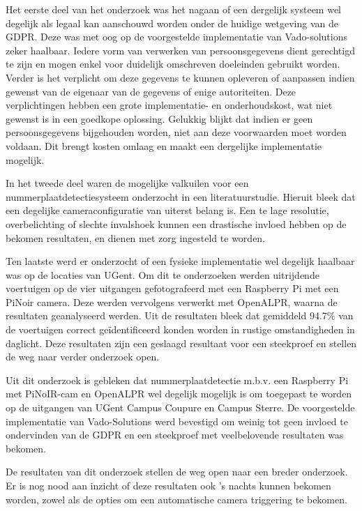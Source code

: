 Het eerste deel van het onderzoek was het nagaan of een dergelijk systeem wel degelijk als legaal kan aanschouwd worden onder de huidige wetgeving van de GDPR. Deze was met oog op de voorgestelde implementatie van Vado-solutions zeker haalbaar. Iedere vorm van verwerken van persoonsgegevens dient gerechtigd te zijn en mogen enkel voor duidelijk omschreven doeleinden gebruikt worden. Verder is het verplicht om deze gegevens te kunnen opleveren of aanpassen indien gewenst van de eigenaar van de gegevens of enige autoriteiten. Deze verplichtingen hebben een grote implementatie- en onderhoudskost, wat niet gewenst is in een goedkope oplossing. Gelukkig blijkt dat indien er geen persoonsgegevens bijgehouden worden, niet aan deze voorwaarden moet worden voldaan. Dit brengt kosten omlaag en maakt een dergelijke implementatie mogelijk.

In het tweede deel waren de mogelijke valkuilen voor een nummerplaatdetectiesysteem onderzocht in een literatuurstudie. Hieruit bleek dat een degelijke cameraconfiguratie van uiterst belang is. Een te lage resolutie, overbelichting of slechte invalshoek kunnen een drastische invloed hebben op de bekomen resultaten, en dienen met zorg ingesteld te worden.

Ten laatste werd er onderzocht of een fysieke implementatie wel degelijk haalbaar was op de locaties van UGent. Om dit te onderzoeken werden uitrijdende voertuigen op de vier uitgangen gefotografeerd met een Raspberry Pi met een PiNoir camera. Deze werden vervolgens verwerkt met OpenALPR, waarna de resultaten geanalyseerd werden. Uit de resultaten bleek dat gemiddeld 94.7\% van de voertuigen correct geïdentificeerd konden worden in rustige omstandigheden in daglicht. Deze resultaten zijn een geslaagd resultaat voor een steekproef en stellen de weg naar verder onderzoek open.

Uit dit onderzoek is gebleken dat nummerplaatdetectie m.b.v. een Raspberry Pi met PiNoIR-cam en OpenALPR wel degelijk mogelijk is om toegepast te worden op de uitgangen van UGent Campus Coupure en Campus Sterre. De voorgestelde implementatie van Vado-Solutions werd bevestigd om weinig tot geen invloed te ondervinden van de GDPR en een steekproef met veelbelovende resultaten was bekomen.

De resultaten van dit onderzoek stellen de weg open naar een breder onderzoek. Er is nog nood aan inzicht of deze resultaten ook 's nachts kunnen bekomen worden, zowel als de opties om een automatische camera triggering te bekomen.
